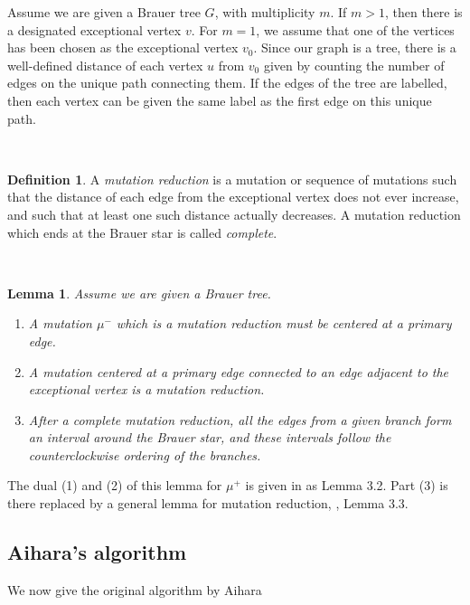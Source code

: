 \documentclass[11pt,english]{article}
\numberwithin{figure}{section}
\numberwithin{equation}{section}
\numberwithin{table}{section}
\newtheorem{lem}{Lemma}[section]
\theoremstyle{definition}
\newtheorem{defn}{Definition}[section]
\theoremstyle{remark}
\begin{document}
Assume we are given a Brauer tree $G$, with multiplicity $m$.  If $m>1$, 
then there is a designated exceptional vertex $v$. For $m=1$, we assume that one of
the vertices has been chosen as the exceptional vertex $v_0$. Since our graph is a tree,
there is a well-defined distance of each vertex $u$ from $v_0$ given by 
counting the number of edges on the unique path connecting them.
If the edges of the tree are labelled, then each vertex can be given
the same label as the first edge on this unique path.

~

\noindent \begin{defn}
	A \textit{mutation reduction} is a mutation or  sequence of mutations such that the distance of 
	each edge from the exceptional vertex does not ever increase,
	and such that at least one such distance actually decreases. A mutation
	reduction which ends at the Brauer star is called \textit{complete}.
\end{defn}

~

\noindent \begin{lem}\label{branch} \cite{SZv} Assume we are given a Brauer tree.
	
	\begin{enumerate}
		\item A mutation $\mu^-$ which is a mutation reduction must be centered at a primary edge.
		\item A mutation centered at a primary edge connected to an edge adjacent to the 
		exceptional vertex is a mutation reduction.
		\item After a complete mutation reduction, all the edges from a given branch 
		form an interval around the Brauer star, and these intervals follow the counterclockwise ordering of the branches.
	\end{enumerate}
\end{lem}

The dual (1) and (2) of this lemma for $\mu^+$ is given in \cite{Z2} as Lemma 3.2.  Part (3) is there replaced by a general lemma for mutation reduction, \cite{Z2}, Lemma 3.3.

\subsection{Aihara's algorithm}

\noindent We now give the original algorithm by Aihara \cite{Ai}

~
\end{document}
